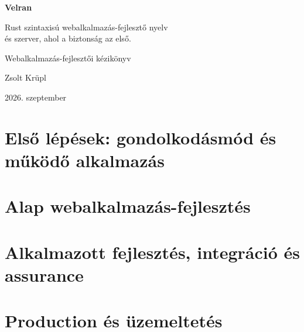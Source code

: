 \documentclass[11pt,a4paper,openany]{book}
\begin{document}
\frontmatter
\begin{titlepage}
\centering
\vspace*{0.16\textheight}
{\Huge\bfseries Velran\par}
\vspace{1.6em}
{\Large Rust szintaxisú webalkalmazás-fejlesztő nyelv\\és szerver, ahol a biztonság az első.\par}
\vspace{2.0em}
{\large Webalkalmazás-fejlesztői kézikönyv\par}
\vfill
{\normalsize Zsolt Krüpl\par}
\vspace{0.7em}
{\small 2026. szeptember\par}
\end{titlepage}

\tableofcontents
\mainmatter
\part{Első lépések: gondolkodásmód és működő alkalmazás}




\part{Alap webalkalmazás-fejlesztés}









\part{Alkalmazott fejlesztés, integráció és assurance}





\part{Production és üzemeltetés}




\end{document}

